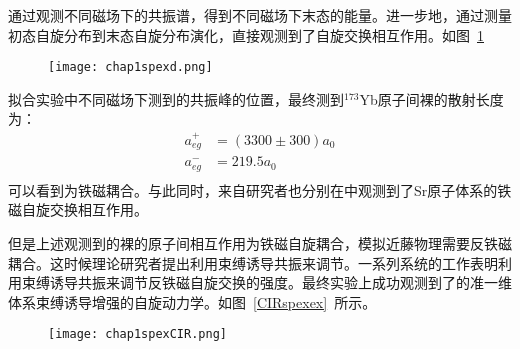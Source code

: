通过观测不同磁场下的共振谱，得到不同磁场下末态的能量。进一步地，通过测量初态自旋分布到末态自旋分布演化\cite{scazza2014observation,cappellini2014direct}，直接观测到了自旋交换相互作用。如图~\ref{egd}~
\begin{figure}[!htbp]
    \centering
    \texttt{[image: chap1spexd.png]}
    \label{egd}
\end{figure}
拟合实验中不同磁场下测到的共振峰的位置，最终测到${}^{173}$Yb原子间裸的散射长度为\cite{scazza2014observation,cappellini2014direct}：
\begin{equation}
\begin{split}
a_{e g}^{+}&=(3300 \pm 300) a_{0}\\
a_{e g}^{-}& = 219.5 a_0\\
\end{split}
\end{equation}
可以看到为铁磁耦合。与此同时，来自研究者也分别在中观测到了Sr原子体系的铁磁自旋交换相互作用\cite{zhang2014spectroscopic}。

但是上述观测到的裸的原子间相互作用为铁磁自旋耦合，模拟近藤物理需要反铁磁耦合。这时候理论研究者提出利用束缚诱导共振来调节。一系列系统的工作表明利用束缚诱导共振来调节反铁磁自旋交换的强度\cite{zhang2016kondo,cheng2017enhancing,zhang2018control,ji2018confinement,zhang2020tight,zhang2020controlling}。最终实验上成功观测到了的准一维体系束缚诱导增强的自旋动力学\cite{riegger2018localized}。如图~\ref{CIRspexex}~所示。
\begin{figure}[!htbp]
    \centering
    \texttt{[image: chap1spexCIR.png]}
    \label{CIRspexexp}
\end{figure}



